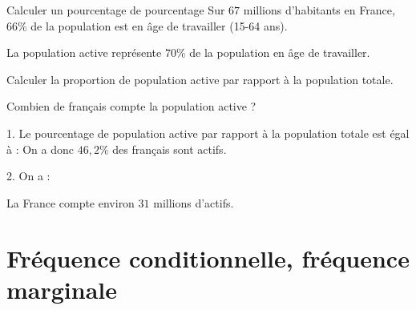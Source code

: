 \begin{methode}{Calculer un pourcentage de pourcentage}
	Sur $67$ millions d'habitants en France, $66\%$ de la population est en âge de travailler (15-64 ans).

	La population active représente $70\%$ de la population en âge de travailler.
	\be
	\item Calculer la proportion de population active par rapport à la population totale.
	\item Combien de français compte la population active ?
	\ee

	\vspace*{10mm}

	\begin{correction}

		1. Le pourcentage de population active par rapport à la population totale est égal à :
		On a donc $46,2\%$ des français sont actifs.

		\smallskip

		2. On a :


		La France compte environ $31$ millions d'actifs.

	\end{correction}
\end{methode}

\section{Fréquence conditionnelle, fréquence marginale}
